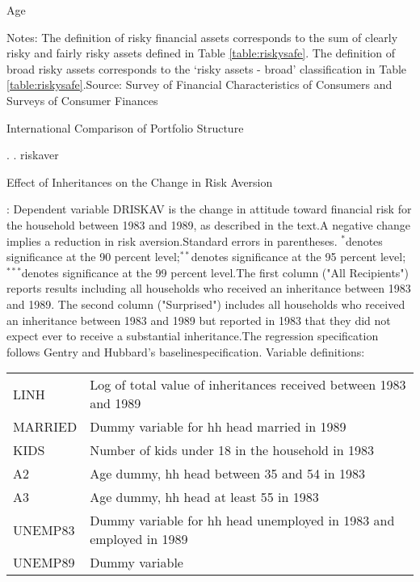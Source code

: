 \documentclass[12pt]{article}
\begin{document}
{{\begin{table}
{Age}\label{table:riskybyage}\vspace{.2in}\centerline{%
}\vspace{.05in}\noindent Notes: The definition of
risky financial assets corresponds to the sum of clearly risky and fairly
risky assets defined in Table \ref{table:riskysafe}.  The definition of
broad risky assets corresponds to the `risky assets - broad' classification
in Table \ref{table:riskysafe}.\medskip\noindent Source: Survey of Financial
Characteristics of Consumers and Surveys of Consumer
Finances\end{table}\clearpage\begin{table}\caption{International Comparison
of Portfolio Structure}\label{table:rich_intl}\end{table}\clearpage.
\clearpage\vfill\eject. \clearpage\vfill\eject
riskaver\clearpage\begin{table}\caption{Effect of Inheritances on the Change
in Risk
Aversion}\medskip\label{table:drho}\centerline{}%
\noindent \end{table}\medskip\footnotesizeNotes: 					Dependent variable
DRISKAV is the change in attitude toward financial risk for the household
between 1983 and 1989, as described in the text.A negative change implies a
reduction in risk aversion.Standard errors in parentheses.					$^{*}$denotes
significance at the 90 percent level;$^{**}$denotes significance at the 95
percent level;$^{***}$denotes significance at the 99 percent level.The first
column ("All Recipients") reports results including all households who
received an inheritance between 1983 and 1989.  The second column
("Surprised") includes all households who received an inheritance between
1983 and 1989 but reported in 1983 that they did not expect ever to receive
a substantial inheritance.The regression specification follows Gentry and
Hubbard's baselinespecification.  Variable definitions:
\begin{tabular}{ll}LINH &  Log of total value of inheritances received
between 1983 and 1989					\\ MARRIED &  Dummy variable for hh head married
in 1989					\\ KIDS &  Number of kids under 18 in the household in
1983					\\ A2 &  Age dummy, hh head between 35 and 54 in 1983					\\ A3 & 
Age dummy, hh head at least 55 in 1983					\\ UNEMP83 &  Dummy variable for
hh head unemployed in 1983 and employed in 1989\\ UNEMP89 &  Dummy variable

\end{tabular}}}
\end{document}
